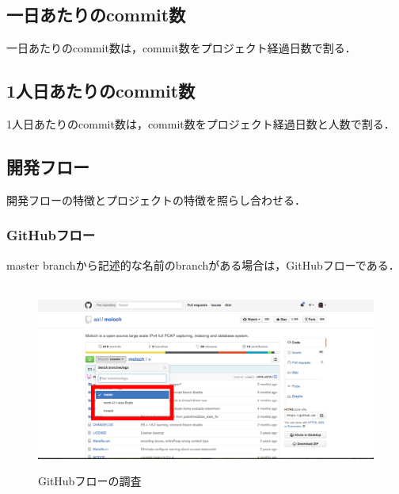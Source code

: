 \subsection{一日あたりのcommit数}
一日あたりのcommit数は，commit数をプロジェクト経過日数で割る．
\subsection{1人日あたりのcommit数}
1人日あたりのcommit数は，commit数をプロジェクト経過日数と人数で割る．





\subsection{開発フロー}
開発フローの特徴とプロジェクトの特徴を照らし合わせる．
\subsubsection{GitHubフロー}
master branchから記述的な名前のbranchがある場合は，GitHubフローである．

\begin{figure}[H]
\centering　
\includegraphics[width=13cm]{githubflow.png}
\caption{GitHubフローの調査}\label{githubフロー}
\end{figure}

